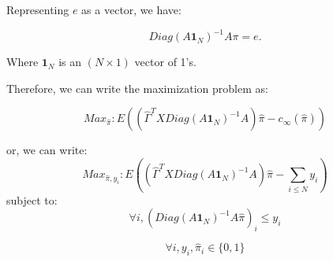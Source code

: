 \documentclass[12pt,a4paper]{article}
\begin{document}
Representing $e$ as a vector, we have: 

$$Diag(A \mathbf{1}_{N} ) ^{-1} A\pi  = e.$$

Where $\mathbf{1}_{N}$ is an $(N \times 1)$ vector of 1's.

Therefore, we can write the maximization problem as:

$$Max_{\hat \pi}: E \left( \left(\hat \Gamma^T X Diag(A \mathbf{1}_{N} ) ^{-1} A \right) \hat \pi  -  c_\infty(\hat \pi) \right)$$

or, we can write:\\


$$Max_{\hat \pi, y_i}: E \left( \left(\hat \Gamma^T X Diag(A \mathbf{1}_{N} ) ^{-1} A \right) \hat \pi  - \sum_{i \leq N} y_i \right)$$ subject to: \\

$$\forall i,  \left( Diag(A \mathbf{1}_{N} ) ^{-1} A \hat \pi \right)_i \leq y_i$$

$$\forall i, y_i, \hat \pi_i \in \{0,1\} $$
\end{document}
